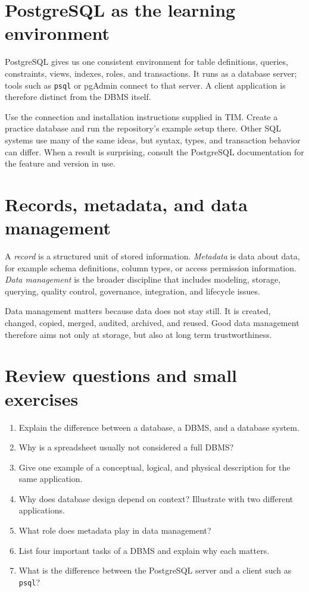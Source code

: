 \documentclass[11pt,a4paper,openany]{book}
\begin{document}
\section{PostgreSQL as the learning environment}
PostgreSQL gives us one consistent environment for table definitions, queries, constraints, views, indexes, roles, and transactions. It runs as a database server; tools such as \texttt{psql} or pgAdmin connect to that server. A client application is therefore distinct from the DBMS itself.

Use the connection and installation instructions supplied in TIM. Create a practice database and run the repository's example setup there. Other SQL systems use many of the same ideas, but syntax, types, and transaction behavior can differ. When a result is surprising, consult the PostgreSQL documentation for the feature and version in use.

\section{Records, metadata, and data management}
A \emph{record} is a structured unit of stored information. \emph{Metadata} is data about data, for example schema definitions, column types, or access permission information. \emph{Data management} is the broader discipline that includes modeling, storage, querying, quality control, governance, integration, and lifecycle issues.

Data management matters because data does not stay still. It is created, changed, copied, merged, audited, archived, and reused. Good data management therefore aims not only at storage, but also at long term trustworthiness.

\section{Review questions and small exercises}
\begin{enumerate}
\item Explain the difference between a database, a DBMS, and a database system.
\item Why is a spreadsheet usually not considered a full DBMS?
\item Give one example of a conceptual, logical, and physical description for the same application.
\item Why does database design depend on context? Illustrate with two different applications.
\item What role does metadata play in data management?
\item List four important tasks of a DBMS and explain why each matters.
\item What is the difference between the PostgreSQL server and a client such as \texttt{psql}?
\end{enumerate}
\end{document}

